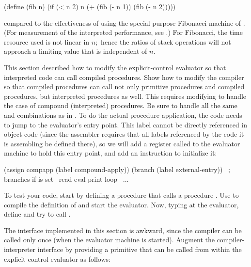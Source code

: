 \begin{exerciseGroup}
\begin{codeBlock}
(define (fib n)
  (if (< n 2)
      n
      (+ (fib (- n 1))
         (fib (- n 2)))))
\end{codeBlock}

\noindent
compared to the effectiveness of using the special-purpose Fibonacci machine of
.  (For measurement of the interpreted performance, see
.)  For Fibonacci, the time resource used is not linear in
\( n; \) hence the ratios of stack operations will not approach a limiting value
that is independent of \( n \).

\label{Exercise 5.47}
 This section described how to
modify the explicit-control evaluator so that interpreted code can call
compiled procedures.  Show how to modify the compiler so that compiled
procedures can call not only primitive procedures and compiled procedures, but
interpreted procedures as well.  This requires modifying
 to handle the case of compound (interpreted)
procedures.  Be sure to handle all the same  and 
combinations as in .  To do the actual procedure
application, the code needs to jump to the evaluator's 
entry point.  This label cannot be directly referenced in object code (since
the assembler requires that all labels referenced by the code it is assembling
be defined there), so we will add a register called  to the
evaluator machine to hold this entry point, and add an instruction to
initialize it:

\begin{codeBlock}
 (assign compapp (label compound-apply))
 (branch (label external-entry)) ~\textrm{; branches if  is set}~
read-eval-print-loop ~\( \dots \)~
\end{codeBlock}

To test your code, start by defining a procedure  that calls a
procedure .  Use  to compile the definition of
 and start the evaluator.  Now, typing at the evaluator, define
 and try to call .

\label{Exercise 5.48}
 The 
interface implemented in this section is awkward, since the compiler can be
called only once (when the evaluator machine is started).  Augment the
compiler-interpreter interface by providing a  primitive
that can be called from within the explicit-control evaluator as follows:


\end{exerciseGroup}
